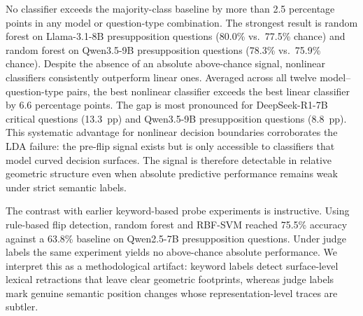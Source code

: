 \documentclass[11pt]{article}
\begin{document}
  No classifier exceeds the majority-class baseline by more than 2.5 percentage
  points in any model or question-type combination. The strongest result is
  random forest on Llama-3.1-8B presupposition questions (80.0\% vs.\ 77.5\%
  chance) and random forest on Qwen3.5-9B presupposition questions (78.3\%
  vs.\ 75.9\% chance). Despite the absence of an absolute above-chance signal,
  nonlinear classifiers consistently outperform linear ones. Averaged across
  all twelve model--question-type pairs, the best nonlinear classifier exceeds
  the best linear classifier by 6.6 percentage points. The gap is most pronounced
  for DeepSeek-R1-7B critical questions (13.3~pp) and Qwen3.5-9B presupposition
  questions (8.8~pp). This systematic advantage for nonlinear decision boundaries
  corroborates the LDA failure: the pre-flip signal exists but is only accessible
  to classifiers that model curved decision surfaces. The signal is therefore detectable in relative geometric structure even when absolute predictive performance remains weak under strict semantic labels.

  The contrast with earlier keyword-based probe experiments is instructive.
  Using rule-based flip detection, random forest and RBF-SVM reached 75.5\%
  accuracy against a 63.8\% baseline on Qwen2.5-7B presupposition questions.
  Under judge labels the same experiment yields no above-chance absolute
  performance. We interpret this as a methodological artifact: keyword labels
  detect surface-level lexical retractions that leave clear geometric footprints,
  whereas judge labels mark genuine semantic position changes whose representation-level
  traces are subtler.



\end{document}
